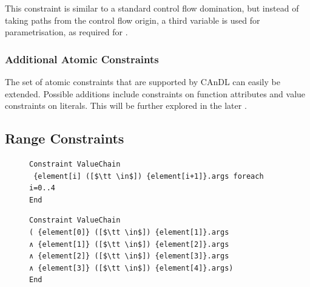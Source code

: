     \noindent
    This constraint is similar to a standard control flow domination, but
    instead of taking paths from the control flow origin, a third variable is
    used for parametrisation, as required for .
    

\subsubsection{Additional Atomic Constraints}

    The set of atomic constraints that are supported by CAnDL can easily be
    extended.
    Possible additions include constraints on function attributes and value
    constraints on literals.
    This will be further explored in the later
    .

\subsection{Range Constraints}

\begin{figure}[t]
\begin{lstlisting}[language=CAnDL]
Constraint ValueChain
 {element[i] ([$\tt \in$]) {element[i+1]}.args foreach i=0..4
End
\end{lstlisting}
\begin{lstlisting}[language=CAnDL,label={fig:forall},caption=
   {Example for the expansion of range constraints in CAnDL:
    The specification at the top can be ``unrolled'' manually, resulting in the
    equivalent, but more verbose, specification below.}]
Constraint ValueChain
( {element[0]} ([$\tt \in$]) {element[1]}.args
∧ {element[1]} ([$\tt \in$]) {element[2]}.args
∧ {element[2]} ([$\tt \in$]) {element[3]}.args
∧ {element[3]} ([$\tt \in$]) {element[4]}.args)
End
\end{lstlisting}
\end{figure}

